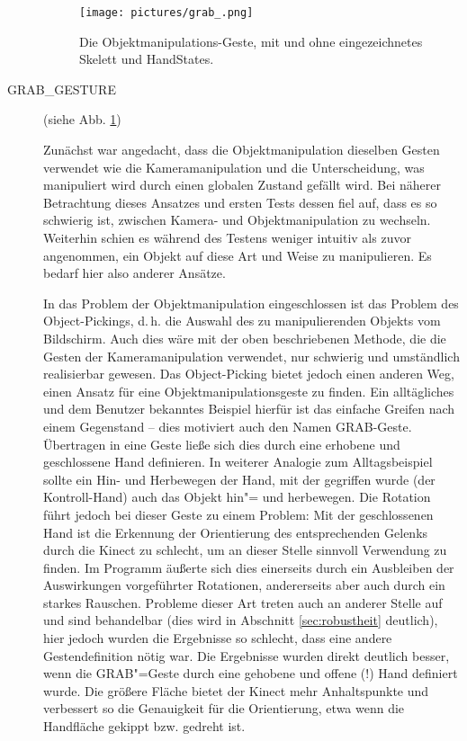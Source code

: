 \begin{description}
\begin{figure}[H]
		\centering
		\texttt{[image: pictures/grab\_.png]}
		\caption{Die Objektmanipulations-Geste, mit und ohne eingezeichnetes Skelett und HandStates.}\label{fig:grabg}
		\end{figure}
		\item[GRAB\_GESTURE] (siehe Abb. \ref{fig:grabg})\par
		Zunächst war angedacht, dass die Objektmanipulation dieselben Gesten verwendet wie die Kameramanipulation und die Unterscheidung, was manipuliert wird durch einen globalen Zustand gefällt wird. Bei näherer Betrachtung dieses Ansatzes und ersten Tests dessen fiel auf, dass es so schwierig ist, zwischen Kamera- und Objektmanipulation zu wechseln. Weiterhin schien es während des Testens weniger intuitiv als zuvor angenommen, ein Objekt auf diese Art und Weise zu manipulieren. Es bedarf hier also anderer Ansätze.\par 
		In das Problem der Objektmanipulation eingeschlossen ist das Problem des Object-Pickings, d.\,h. die Auswahl des zu manipulierenden Objekts vom Bildschirm. Auch dies wäre mit der oben beschriebenen Methode, die die Gesten der Kameramanipulation verwendet, nur schwierig und umständlich realisierbar gewesen. Das Object-Picking bietet jedoch einen anderen Weg, einen Ansatz für eine Objektmanipulationsgeste zu finden. Ein alltägliches und dem Benutzer bekanntes Beispiel hierfür ist das einfache Greifen nach einem Gegenstand -- dies motiviert auch den Namen \glqq{}GRAB\grqq{}-Geste. Übertragen in eine Geste ließe sich dies durch eine erhobene und geschlossene Hand definieren. In weiterer Analogie zum Alltagsbeispiel sollte ein Hin- und Herbewegen der Hand, mit der gegriffen wurde (der \glqq Kontroll-Hand\grqq{}) auch das Objekt hin"= und herbewegen. Die Rotation führt jedoch bei dieser Geste zu einem Problem: Mit der geschlossenen Hand ist die Erkennung der Orientierung des entsprechenden Gelenks durch die Kinect zu schlecht, um an dieser Stelle sinnvoll Verwendung zu finden. Im Programm äußerte sich dies einerseits durch ein Ausbleiben der Auswirkungen vorgeführter Rotationen, andererseits aber auch durch ein starkes Rauschen. Probleme dieser Art treten auch an anderer Stelle auf und sind behandelbar (dies wird in Abschnitt \ref{sec:robustheit} deutlich), hier jedoch wurden die Ergebnisse so schlecht, dass eine andere Gestendefinition nötig war. Die Ergebnisse wurden direkt deutlich besser, wenn die GRAB"=Geste durch eine gehobene und offene (!) Hand definiert wurde. Die größere Fläche bietet der Kinect mehr Anhaltspunkte und verbessert so die Genauigkeit für die Orientierung, etwa wenn die Handfläche gekippt bzw. gedreht ist.

\end{description}
